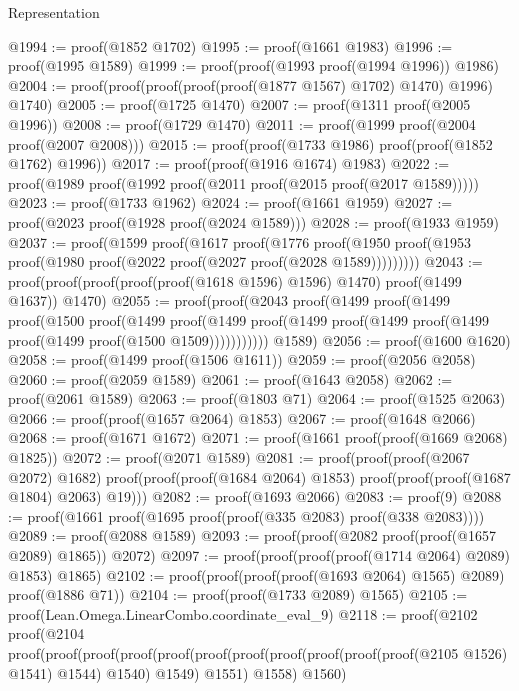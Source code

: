 \begin{lexlean}{Representation}
\begin{coremodule}
@1994 := proof(@1852 @1702)
@1995 := proof(@1661 @1983)
@1996 := proof(@1995 @1589)
@1999 := proof(proof(@1993 proof(@1994 @1996)) @1986)
@2004 := proof(proof(proof(proof(proof(@1877 @1567) @1702) @1470) @1996) @1740)
@2005 := proof(@1725 @1470)
@2007 := proof(@1311 proof(@2005 @1996))
@2008 := proof(@1729 @1470)
@2011 := proof(@1999 proof(@2004 proof(@2007 @2008)))
@2015 := proof(proof(@1733 @1986) proof(proof(@1852 @1762) @1996))
@2017 := proof(proof(@1916 @1674) @1983)
@2022 := proof(@1989 proof(@1992 proof(@2011 proof(@2015 proof(@2017 @1589)))))
@2023 := proof(@1733 @1962)
@2024 := proof(@1661 @1959)
@2027 := proof(@2023 proof(@1928 proof(@2024 @1589)))
@2028 := proof(@1933 @1959)
@2037 := proof(@1599
      proof(@1617
          proof(@1776
              proof(@1950 proof(@1953 proof(@1980 proof(@2022 proof(@2027 proof(@2028 @1589)))))))))
@2043 := proof(proof(proof(proof(proof(@1618 @1596) @1596) @1470) proof(@1499 @1637)) @1470)
@2055 := proof(proof(@2043
        proof(@1499
            proof(@1499
                proof(@1500
                    proof(@1499
                        proof(@1499
                            proof(@1499
                                proof(@1499 proof(@1499 proof(@1499 proof(@1500 @1509)))))))))))
      @1589)
@2056 := proof(@1600 @1620)
@2058 := proof(@1499 proof(@1506 @1611))
@2059 := proof(@2056 @2058)
@2060 := proof(@2059 @1589)
@2061 := proof(@1643 @2058)
@2062 := proof(@2061 @1589)
@2063 := proof(@1803 @71)
@2064 := proof(@1525 @2063)
@2066 := proof(proof(@1657 @2064) @1853)
@2067 := proof(@1648 @2066)
@2068 := proof(@1671 @1672)
@2071 := proof(@1661 proof(proof(@1669 @2068) @1825))
@2072 := proof(@2071 @1589)
@2081 := proof(proof(proof(@2067 @2072) @1682)
      proof(proof(proof(@1684 @2064) @1853) proof(proof(proof(@1687 @1804) @2063) @19)))
@2082 := proof(@1693 @2066)
@2083 := proof(9)
@2088 := proof(@1661 proof(@1695 proof(proof(@335 @2083) proof(@338 @2083))))
@2089 := proof(@2088 @1589)
@2093 := proof(proof(@2082 proof(proof(@1657 @2089) @1865)) @2072)
@2097 := proof(proof(proof(proof(@1714 @2064) @2089) @1853) @1865)
@2102 := proof(proof(proof(proof(@1693 @2064) @1565) @2089) proof(@1886 @71))
@2104 := proof(proof(@1733 @2089) @1565)
@2105 := proof(Lean.Omega.LinearCombo.coordinate_eval_9)
@2118 := proof(@2102
      proof(@2104
          proof(proof(proof(proof(proof(proof(proof(proof(proof(proof(proof(@2105 @1526) @1541)
                              @1544)
                            @1540)
                          @1549)
                        @1551)
                      @1558)
                    @1560)

\end{coremodule}
\end{lexlean}

